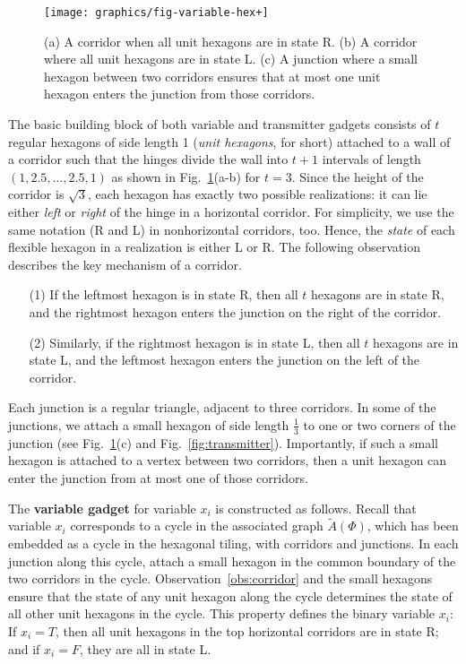 \begin{figure}[htbp]
	\centering
	\texttt{[image: graphics/fig-variable-hex+]}
	\caption{(a) A corridor when all unit hexagons are in state R.
(b) A corridor where all unit hexagons are in state L.
(c) A junction where a small hexagon between two corridors
    ensures that at most one unit hexagon enters the junction from those corridors.}
	\label{fig:variable}
\end{figure}

The basic building block of both variable and transmitter gadgets consists of $t$ regular hexagons of side length 1 (\emph{unit hexagons}, for short) attached to a wall of a corridor such that the hinges divide the wall into $t+1$ intervals of length $(1,2.5,\ldots ,2.5,1)$ as shown in Fig.~\ref{fig:variable}(a-b) for $t=3$. Since the height of the corridor is $\sqrt{3}$, each hexagon has exactly two possible realizations: it can lie either \emph{left} or \emph{right} of the hinge in a horizontal corridor. For simplicity, we use the same notation (R and L) in nonhorizontal corridors, too. Hence, the \emph{state} of each flexible hexagon in a realization is either L or R. The following observation describes the key mechanism of a corridor.

\begin{observation}\label{obs:corridor}
\begin{itemize}
\item[]
\item[(1)] If the leftmost hexagon is in state R, then all $t$ hexagons are in state R, and the rightmost hexagon enters the junction on the right of the corridor.
\item[(2)] Similarly, if the rightmost hexagon is in state L, then all $t$ hexagons are in state L, and the leftmost hexagon enters the junction on the left of the corridor.
\end{itemize}
\end{observation}

Each junction is a regular triangle, adjacent to three corridors. In some of the junctions, we attach a small hexagon of side length $\frac{1}{3}$ to one or two corners of the junction (see Fig.~\ref{fig:variable}(c) and Fig.~\ref{fig:transmitter}). Importantly, if such a small hexagon is attached to a vertex between two corridors, then a unit hexagon can enter the junction from at most one of those corridors.

The {\bf variable gadget} for variable $x_i$ is constructed as follows. Recall that variable $x_i$ corresponds to a cycle in the associated graph $\tilde{A}(\Phi)$, which has been embedded as a cycle in the hexagonal tiling, with corridors and junctions. In each junction along this cycle, attach a small hexagon in the common boundary of the two corridors in the cycle. Observation~\ref{obs:corridor} and the small hexagons ensure that the state of any unit hexagon along the cycle determines the state of all other unit hexagons in the cycle. This property defines the binary variable $x_i$: If $x_i=T$, then all unit hexagons in the top horizontal corridors are in state R; and if $x_i=F$, they are all in state L.

